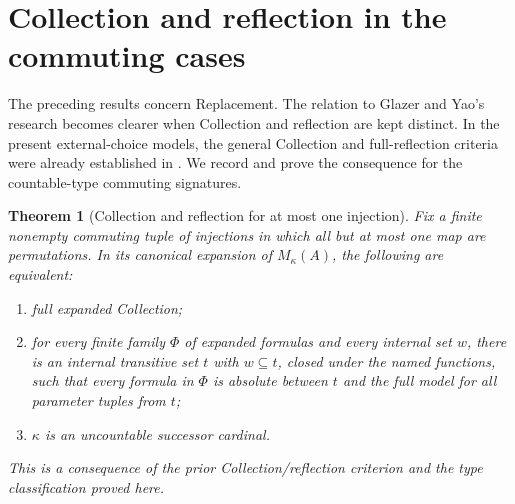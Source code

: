 \documentclass[11pt,letterpaper]{article}
\numberwithin{equation}{section}
\theoremstyle{plain}
\newtheorem{theorem}{Theorem}[section]
\theoremstyle{definition}
\theoremstyle{remark}
\newcommand{\Mk}{M_\kappa(A)}
\begin{document}
\section{Collection and reflection in the commuting cases}\label{nee:ca:sec:reflection}

The preceding results concern Replacement. The relation to Glazer and Yao's research becomes clearer when Collection and reflection are kept distinct. In the present external-choice models, the general Collection and full-reflection criteria were already established in \cite[Theorems 7.5 and 7.7]{RepoNaming}. We record and prove the consequence for the countable-type commuting signatures.

\begin{theorem}[Collection and reflection for at most one injection]\label{nee:ca:thm:commuting-collection}
Fix a finite nonempty commuting tuple of injections in which all but at most one map are permutations. In its canonical expansion of $\Mk$, the following are equivalent:
\begin{enumerate}[label=(\roman*)]
\item full expanded Collection;
\item for every finite family $\Phi$ of expanded formulas and every internal set $w$, there is an internal transitive set $t$ with $w\subseteq t$, closed under the named functions, such that every formula in $\Phi$ is absolute between $t$ and the full model for all parameter tuples from $t$;
\item $\kappa$ is an uncountable successor cardinal.
\end{enumerate}
This is a consequence of the prior Collection/reflection criterion and the type classification proved here.
\end{theorem}
\end{document}
